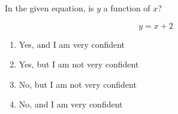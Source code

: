 \bigskip

\item In the given equation, is $y$ a function of $x$?

$$
y = x+ 2
$$

\begin{enumerate}
\item Yes, and I am very confident
\item Yes, but I am not very confident
\item No, but I am not very confident
\item No, and I am very confident
\end{enumerate}

